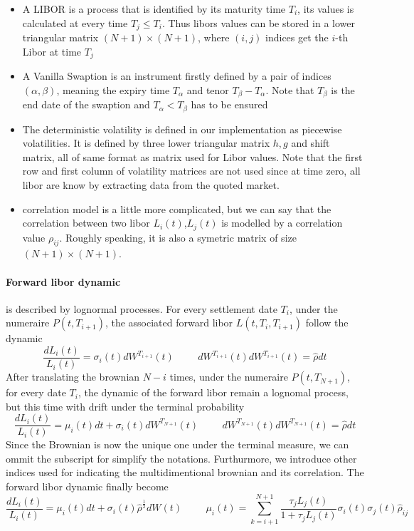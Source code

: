 \documentclass[a4paper,10pt]{article}
\newcommand{\Ti}{T_{i}}
\newcommand{\Ta}{T_{\alpha}}
\newcommand{\Tb}{T_{\beta}}
\newcommand{\Tii}{T_{i+1}}
\newcommand{\Ptii}{P(t,T_{i+1})}
\newcommand{\Lti}{L(t,\Ti,\Tii)}
\newcommand{\Lit}{L_{i}(t)}
\newcommand{\muit}{\mu_i(t)}
\newcommand{\sigmait}{\sigma_i(t)}
\newcommand{\Wit}{W^{\Tii}(t)}
\newcommand{\Wnt}{W^{T_{N+1}}(t)}
\newcommand{\Ljt}{L_{j}(t)}
\newcommand{\sigmajt}{\sigma_j(t)}
\newcommand{\rhoij}{\rho_{ij}}
\begin{document}
\begin{itemize}
 \item A LIBOR is a process that is identified by its maturity time $T_i$, its values is calculated at every time $T_j\leq T_i$. Thus libors values can be stored in a lower triangular matrix $(N+1)\times(N+1)$, where $(i,j)$ indices get the $i$-th Libor at time $T_j$
 \item A Vanilla Swaption is an instrument firstly defined by a pair of indices $(\alpha,\beta)$, meaning the expiry time $\Ta$ and tenor $\Tb-\Ta$. Note that $\Tb$ is the end date of the swaption and $\Ta<\Tb$ has to be ensured
 \item The deterministic volatility is defined in our implementation as piecewise volatilities. It is defined by three lower triangular matrix $h,g$ and shift matrix, all of same format as matrix used for Libor values. Note that the first row and first column of volatility matrices are not used since at time zero, all libor are know by extracting data from the quoted market.
 \item correlation model is a little more complicated, but we can say that the correlation between two libor $\Lit$,$\Ljt$ is modelled by a correlation value $\rhoij$. Roughly speaking, it is also a symetric matrix of size $(N+1)\times(N+1)$.   
\end{itemize}
\paragraph{Forward libor dynamic } is described by lognormal processes. For every settlement date $\Ti$, under the numeraire $\Ptii$, the associated forward libor $\Lti$ follow the dynamic
\[
\frac{d\Lit}{\Lit} = \sigmait d\Wit 
\hspace{1cm}
d\Wit d\Wit = \hat{\rho} dt
\]
After translating the brownian $N-i$ times, under the numeraire $P(t,T_{N+1})$, for every date $\Ti$, the dynamic of the forward libor remain a lognomal process, but this time with drift under the terminal probability  
\[
\frac{d\Lit}{\Lit} = \muit dt + \sigmait d\Wnt
\hspace{1cm}
d\Wnt d\Wnt = \hat{\rho} dt
\]
Since the Brownian is now the unique one under the terminal measure, we can ommit the subscript for simplify the notations. Furthurmore, we introduce other indices used for indicating the multidimentional brownian and its correlation. The forward libor dynamic finally become
\begin{equation}
\label{eq:libor_dynamic}
\frac{d\Lit}{\Lit} = \muit dt + \sigmait \hat{\rho}^{\frac{1}{2} } dW(t)
\hspace{1cm}
\muit = \sum_{k=i+1}^{N+1} \frac{\tau_j \Ljt}{1+\tau_j \Ljt} \sigmait \sigmajt \hat{\rho}_{ij}
\end{equation}
\end{document}
